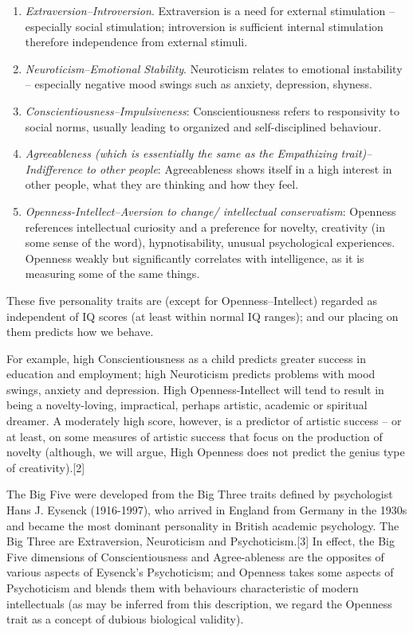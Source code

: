 \documentclass[
]{book}
\providecommand{\tightlist}{%
  \setlength{\itemsep}{0pt}\setlength{\parskip}{0pt}}
\begin{document}
\begin{enumerate}
\def\labelenumi{(\arabic{enumi})}
\tightlist
\item
  \emph{Extraversion--Introversion}. Extraversion is a need for external stimulation -- especially social stimulation; introversion is sufficient internal stimulation therefore independence from external stimuli.
\item
  \emph{Neuroticism--Emotional Stability}. Neuroticism relates to emotional instability -- especially negative mood swings such as anxiety, depression, shyness.
\item
  \emph{Conscientiousness--Impulsiveness}: Conscientiousness refers to responsivity to social norms, usually leading to organized and self-disciplined behaviour.
\item
  \emph{Agreeableness (which is essentially the same as the Empathizing trait)--Indifference to other people}: Agreeableness shows itself in a high interest in other people, what they are thinking and how they feel.
\item
  \emph{Openness-Intellect--Aversion to change/ intellectual conservatism}: Openness references intellectual curiosity and a preference for novelty, creativity (in some sense of the word), hypnotisability, unusual psychological experiences. Openness weakly but significantly correlates with intelligence, as it is measuring some of the same things.
\end{enumerate}

These five personality traits are (except for Openness--Intellect) regarded as independent of IQ scores (at least within normal IQ ranges); and our placing on them predicts how we behave.

For example, high Conscientiousness as a child predicts greater success in education and employment; high Neuroticism predicts problems with mood swings, anxiety and depression. High Openness-Intellect will tend to result in being a novelty-loving, impractical, perhaps artistic, academic or spiritual dreamer. A moderately high score, however, is a predictor of artistic success -- or at least, on some measures of artistic success that focus on the production of novelty (although, we will argue, High Openness does not predict the genius type of creativity).{[}2{]}

The Big Five were developed from the Big Three traits defined by psychologist Hans J. Eysenck (1916-1997), who arrived in England from Germany in the 1930s and became the most dominant personality in British academic psychology. The Big Three are Extraversion, Neuroticism and Psychoticism.{[}3{]} In effect, the Big Five dimensions of Conscientiousness and Agree-ableness are the opposites of various aspects of Eysenck's Psychoticism; and Openness takes some aspects of Psychoticism and blends them with behaviours characteristic of modern intellectuals (as may be inferred from this description, we regard the Openness trait as a concept of dubious biological validity).
\end{document}
